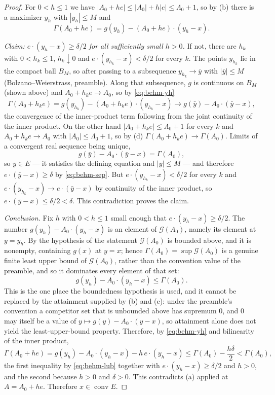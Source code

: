 \begin{proof}
For $0<h\le1$ we have $|A_0+he|\le|A_0|+h|e|\le\Lambda_0+1$, so by (b) there is a
maximizer $y_h$ with $|y_h|\le M$ and
\begin{equation}\label{eq:behm-yh}
  \Gamma(A_0+he)=g(y_h)-(A_0+he)\cdot(y_h-x).
\end{equation}

\emph{Claim: $e\cdot(y_h-x)\ge\delta/2$ for all sufficiently small $h>0$.}
If not, there are $h_k$ with $0<h_k\le1$, $h_k\downarrow0$ and
$e\cdot(y_{h_k}-x)<\delta/2$ for every $k$. The points $y_{h_k}$ lie in the
compact ball $B_M$, so after passing to a subsequence $y_{h_k}\to\bar y$ with
$|\bar y|\le M$ (Bolzano--Weierstrass, preamble). Along that subsequence,
$g$ is continuous on $B_M$ (shown above) and $A_0+h_ke\to A_0$, so by
\eqref{eq:behm-yh}
\[
  \Gamma(A_0+h_ke)=g(y_{h_k})-(A_0+h_ke)\cdot(y_{h_k}-x)
   \longrightarrow g(\bar y)-A_0\cdot(\bar y-x),
\]
the convergence of the inner-product term following from the joint continuity of
the inner product. On the other hand $|A_0+h_ke|\le\Lambda_0+1$ for every $k$ and
$A_0+h_ke\to A_0$ with $|A_0|\le\Lambda_0+1$, so by (d)
$\Gamma(A_0+h_ke)\to\Gamma(A_0)$. Limits of a convergent real sequence being
unique,
\[
  g(\bar y)-A_0\cdot(\bar y-x)=\Gamma(A_0),
\]
so $\bar y\in E$ — it satisfies the defining equation and $|\bar y|\le M$ — and
therefore $e\cdot(\bar y-x)\ge\delta$ by \eqref{eq:behm-sep}. But
$e\cdot(y_{h_k}-x)<\delta/2$ for every $k$ and
$e\cdot(y_{h_k}-x)\to e\cdot(\bar y-x)$ by continuity of the inner product, so
$e\cdot(\bar y-x)\le\delta/2<\delta$. This contradiction proves the claim.

\emph{Conclusion.}
Fix $h$ with $0<h\le1$ small enough that $e\cdot(y_h-x)\ge\delta/2$. The number
$g(y_h)-A_0\cdot(y_h-x)$ is an element of $\mathcal G(A_0)$, namely its element at
$y=y_h$. By the hypothesis of the statement $\mathcal G(A_0)$ is bounded above,
and it is nonempty, containing $g(x)$ at $y=x$; hence
$\Gamma(A_0)=\sup\mathcal G(A_0)$ is a genuine finite least upper bound of
$\mathcal G(A_0)$, rather than the convention value of the preamble, and so it
dominates every element of that set:
\begin{equation}\label{eq:behm-lub}
  g(y_h)-A_0\cdot(y_h-x)\le\Gamma(A_0).
\end{equation}
This is the one place the boundedness hypothesis is used, and it cannot be
replaced by the attainment supplied by (b) and (c): under the preamble's
convention a competitor set that is unbounded above has supremum $0$, and $0$ may
itself be a value of $y\mapsto g(y)-A_0\cdot(y-x)$, so attainment alone does not
yield the least-upper-bound property. Therefore, by \eqref{eq:behm-yh} and
bilinearity of the inner product,
\[
  \Gamma(A_0+he)=g(y_h)-A_0\cdot(y_h-x)-h\,e\cdot(y_h-x)
   \le\Gamma(A_0)-\frac{h\delta}{2}
   <\Gamma(A_0),
\]
the first inequality by \eqref{eq:behm-lub} together with
$e\cdot(y_h-x)\ge\delta/2$ and $h>0$, and the second because $h>0$ and
$\delta>0$. This contradicts (a) applied at $A=A_0+he$.
Therefore $x\in\operatorname{conv}E$.
\end{proof}
